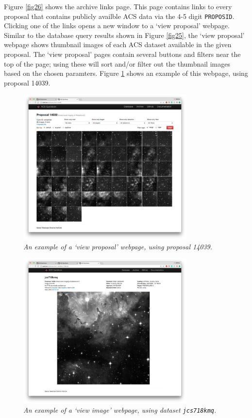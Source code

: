 \documentclass[10pt,journal,compsoc]{IEEEtran}
\begin{document}
Figure \ref{fig26} shows the archive links page.  This page contains links to every proposal that contains publicly availble ACS data via the 4-5 digit \texttt{PROPOSID}.  Clicking one
of the links opens a new window to a `view proposal' webpage.  Similar to the database query results shown in Figure \ref{fig25}, the `view proposal' webpage shows
thumbnail images of each ACS dataset available in the given proposal.  The `view proposal' pages contain several buttons and filters near the top of the page; using these will sort and/or
filter out the thumbnail images based on the chosen paramters.  Figure \ref{fig27} shows an example of this webpage, using proposal 14039.

\begin{figure}[!t]
\centering
\includegraphics[width=3.5in]{./figures/view_proposal.png}
\caption{\textit{An example of a `view proposal' webpage, using proposal 14039.}}
\label{fig27}
\end{figure}

\begin{figure}[!t]
\centering
\includegraphics[width=3.5in]{./figures/view_image.png}
\caption{\textit{An example of a `view image' webpage, using dataset \texttt{jcs718kmq}.}}
\label{fig28}
\end{figure}
\end{document}
